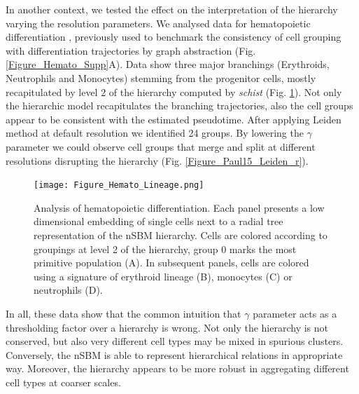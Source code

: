\documentclass[10pt]{article}
\begin{document}
In another context, we tested the effect on the interpretation of the hierarchy varying the resolution parameters. We analysed data for hematopoietic differentiation \cite{paul_2015}, previously used to benchmark the consistency of cell grouping with differentiation trajectories by graph abstraction \cite{wolf_2019} (Fig. \ref{Figure_Hemato_Supp}A). Data show three major branchings (Erythroids, Neutrophils and Monocytes) stemming from the progenitor cells, mostly recapitulated by level 2 of the hierarchy computed by \emph{schist} (Fig. \ref{Figure_Hemato_Lineage}). Not only the hierarchic model recapitulates the branching trajectories, also the cell groups appear to be consistent with the estimated pseudotime. After applying Leiden method at default resolution we identified 24 groups. By lowering the $\gamma$ parameter we could observe cell groups that merge and split at different resolutions disrupting the hierarchy (Fig. \ref{Figure_Paul15_Leiden_r}). 


\begin{figure}[H]
\centering
\texttt{[image: Figure\_Hemato\_Lineage.png]}
\caption[]{Analysis of hematopoietic differentiation. Each panel presents a low dimensional embedding of single cells next to a radial tree representation of the nSBM hierarchy. Cells are colored according to groupings at level 2 of the hierarchy, group 0 marks the most primitive population (A). In subsequent panels, cells are colored using a signature of erythroid lineage (B), monocytes (C) or neutrophils (D).}\label{Figure_Hemato_Lineage}
\end{figure}

In all, these data show that the common intuition that $\gamma$ parameter acts as a thresholding factor over a hierarchy is wrong. Not only the hierarchy is not conserved, but also very different cell types may be mixed in spurious clusters. Conversely, the nSBM is able to represent hierarchical relations in appropriate way. Moreover, the hierarchy appears to be more robust in aggregating different cell types at coarser scales.


\end{document}
